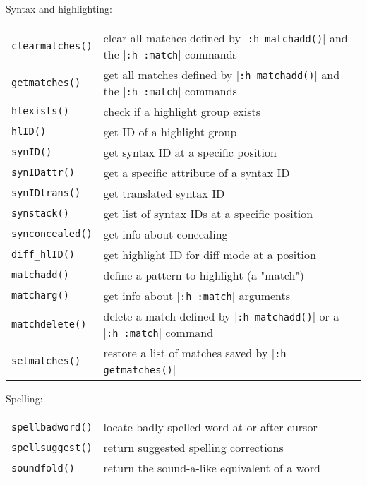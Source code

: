 Syntax and highlighting:
\label{syntax-functions}
\label{highlighting-functions}
\begin{center} \begin{tabular}{l l}
				\texttt{clearmatches()} & clear all matches defined by |\texttt{:h matchadd()}| and the |\texttt{:h :match}| commands \\
				\texttt{getmatches()} & get all matches defined by |\texttt{:h matchadd()}| and the |\texttt{:h :match}| commands \\
				\texttt{hlexists()} & check if a highlight group exists \\
				\texttt{hlID()} & get ID of a highlight group \\
				\texttt{synID()} & get syntax ID at a specific position \\
				\texttt{synIDattr()} & get a specific attribute of a syntax ID \\
				\texttt{synIDtrans()} & get translated syntax ID \\
				\texttt{synstack()} & get list of syntax IDs at a specific position \\
				\texttt{synconcealed()} & get info about concealing \\
				\texttt{diff\_hlID()} & get highlight ID for diff mode at a position \\
				\texttt{matchadd()} & define a pattern to highlight (a "match") \\
				\texttt{matcharg()} & get info about |\texttt{:h :match}| arguments \\
				\texttt{matchdelete()} & delete a match defined by |\texttt{:h matchadd()}| or a |\texttt{:h :match}| command \\
				\texttt{setmatches()} & restore a list of matches saved by |\texttt{:h getmatches()}| \\
\end{tabular} \end{center}

Spelling:
\label{spell-functions}
\begin{center} \begin{tabular}{l l}
				\texttt{spellbadword()} & locate badly spelled word at or after cursor \\
				\texttt{spellsuggest()} & return suggested spelling corrections \\
				\texttt{soundfold()} & return the sound-a-like equivalent of a word \\
\end{tabular} \end{center}

